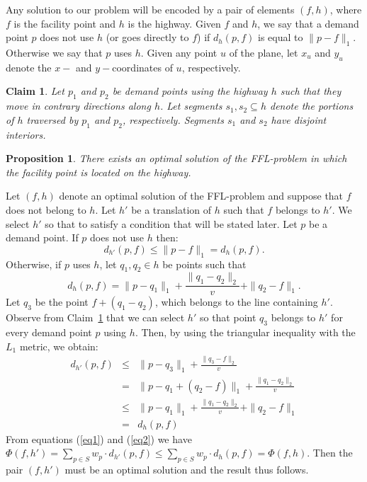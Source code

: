 \documentclass[11pt,a4paper,oneside,onecolumn]{article}
\newcommand{\x}[1]{x_{#1}}
\newcommand{\y}[1]{y_{#1}}
\newtheorem{claim}[theorem]{Claim}
\newtheorem{proposition}[theorem]{Proposition}
\def\QED{\ensuremath{{\square}}}
\def\markatright#1{\leavevmode\unskip\nobreak\quad\hspace*{\fill}{#1}}
\newenvironment{proof}
{\begin{trivlist}\item[\hskip\labelsep{\bf Proof.}]}
{\markatright{\QED}\end{trivlist}}
\begin{document}
Any solution to our problem will be encoded by a pair of elements
$(f,h)$, where $f$ is the facility point and $h$ is the highway.
Given $f$ and $h$, we say that a demand point $p$ does not use $h$
(or goes directly to $f$) if $d_{h}(p,f)$ is equal to $\|p-f\|_1$.
Otherwise we say that $p$ uses $h$. Given any point $u$ of the plane,
let $\x{u}$ and $\y{u}$ denote the $x-$ and $y-$coordinates of $u$,
respectively.
\begin{claim}\label{claim1}
Let $p_1$ and $p_2$ be demand points using the highway $h$ such that 
they move in contrary directions along $h$. Let segments $s_1,s_2\subseteq h$
denote the portions of $h$ traversed by $p_1$ and $p_2$, respectively.
Segments $s_1$ and $s_2$ have disjoint interiors.
\end{claim}
\newpage
\begin{proposition}\label{prop:fac-in-highway}
There exists an optimal solution of the
FFL-problem in which the facility point is located on the highway.
\end{proposition}
\begin{proof}
Let $(f,h)$ denote an optimal solution of the FFL-problem and
suppose that $f$ does not belong to $h$. Let $h'$ be a translation of $h$
such that $f$ belongs to $h'$. We select $h'$ so that to satisfy a condition that
will be stated later. Let $p$ be a demand
point. If $p$ does not use $h$ then:
\begin{equation}
d_{h'}(p,f)\leq\|p-f\|_1=d_h(p,f).
\end{equation}
Otherwise, if $p$ uses $h$, let $q_1,q_2\in h$ be points such that
$$d_h(p,f)=\|p-q_1\|_1+\frac{\|q_1-q_2\|_2}{v}+\|q_2-f\|_1.$$
Let $q_3$ be the point $f+(q_1-q_2)$, which belongs to the line
containing $h'$. Observe from
Claim~\ref{claim1}
that we can select $h'$ so that point $q_3$ belongs to $h'$ for every
demand point $p$ using $h$. Then, by using the triangular inequality with the
$L_1$ metric, we obtain:
\begin{eqnarray}
\nonumber
 d_{h'}(p,f) & \leq & \|p-q_3\|_1+\frac{\|q_3-f\|_2}{v} \\
\nonumber
             &   =  & \|p-q_1+(q_2-f)\|_1+\frac{\|q_1-q_2\|_2}{v} \\
\nonumber
             & \leq & \|p-q_1\|_1+\frac{\|q_1-q_2\|_2}{v}+\|q_2-f\|_1\\
             &   =  & d_h(p,f)\label{eq2}
\end{eqnarray}
From equations (\ref{eq1}) and (\ref{eq2}) we have
$\Phi(f,h')=\sum_{p\in S}w_p \cdot d_{h'}(p,f)\leq\sum_{p\in
S}w_p\cdot d_h(p,f)=\Phi(f,h)$. Then the pair $(f,h')$ must be an
optimal solution and the result thus follows.
\end{proof}
\end{document}
